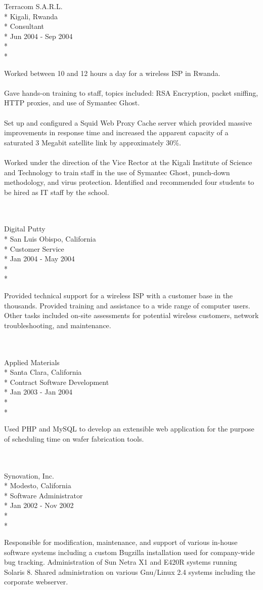 \documentclass[10pt]{article}
\newcommand{\work}[5]{ 
#1\\*
#3\\*
#4\\*
#2\\*
\\*
\makebox[1.25in][l]{}
\begin{minipage}[t]{5.00in}\small{#5}\end{minipage}
\\
\\
}
\begin{document}
\newpage

\work{Terracom S.A.R.L.}{Jun 2004 - Sep 2004}{Kigali, Rwanda}{Consultant}{
Worked between 10 and 12 hours a day for a wireless ISP in Rwanda.
\\
\\
Gave hands-on training to staff, topics included: RSA Encryption, packet sniffing, HTTP proxies, and use of Symantec Ghost.
\\
\\
Set up and configured a Squid Web Proxy Cache server which provided massive improvements in response time and increased the apparent capacity of a saturated 3 Megabit satellite link by approximately 30\%.
\\
\\
Worked under the direction of the Vice Rector at the Kigali Institute of Science and Technology to train staff 
in the use of Symantec Ghost, punch-down methodology, and virus protection. 
Identified and recommended four students to be hired as IT staff by the school.
}

\work{Digital Putty}{Jan 2004 - May 2004}{San Luis Obispo, California}{Customer Service}{
Provided technical support for a wireless ISP with a customer base in the thousands. 
Provided training and assistance to a wide range of computer users. 
Other tasks included on-site assessments for potential wireless customers, network troubleshooting, and maintenance.
}

\work{Applied Materials}{Jan 2003 - Jan 2004}{Santa Clara, California}{Contract Software Development}{
Used PHP and MySQL to develop an extensible web application for the purpose of scheduling time on wafer fabrication tools.
}


\work{Synovation, Inc.}{Jan 2002 - Nov 2002}{Modesto, California}{Software Administrator}{
Responsible for modification, maintenance, and support of various in-house software systems 
including a custom Bugzilla installation used for company-wide bug tracking. 
Administration of Sun Netra X1 and E420R systems running Solaris 8. 
Shared administration on various Gnu/Linux 2.4 systems including the corporate webserver.
}

\end{document}
